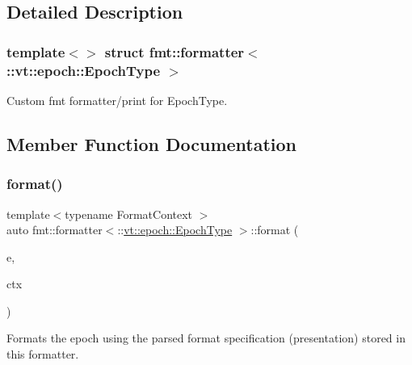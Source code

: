 \subsection{Detailed Description}
\subsubsection*{template$<$$>$\newline
struct fmt\+::formatter$<$\+::vt\+::epoch\+::\+Epoch\+Type $>$}

Custom fmt formatter/print for {\ttfamily Epoch\+Type}. 

\subsection{Member Function Documentation}
\mbox{\label{structfmt_1_1formatter_3_1_1vt_1_1epoch_1_1_epoch_type_01_4_a34449dc509ad77ff399c20dbd66646fc}} 
\subsubsection{\texorpdfstring{format()}{format()}}
{\footnotesize\ttfamily template$<$typename Format\+Context $>$ \\
auto fmt\+::formatter$<$\+::\hyperlink{structvt_1_1epoch_1_1_epoch_type}{vt\+::epoch\+::\+Epoch\+Type} $>$\+::format (\begin{DoxyParamCaption}\item[{\+::\hyperlink{structvt_1_1epoch_1_1_epoch_type}{vt\+::epoch\+::\+Epoch\+Type} const \&}]{e,  }\item[{Format\+Context \&}]{ctx }\end{DoxyParamCaption})\hspace{0.3cm}{\ttfamily [inline]}}

Formats the epoch using the parsed format specification (presentation) stored in this formatter. \mbox{\label{structfmt_1_1formatter_3_1_1vt_1_1epoch_1_1_epoch_type_01_4_ac358b7f617248c72cd9e7cc77f622cdd}} 
